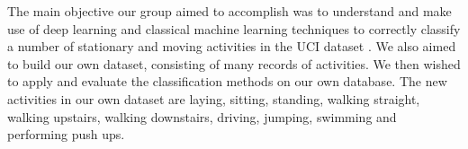 The main objective our group aimed to accomplish was to understand and make use of deep learning and classical machine learning
techniques to correctly classify a number of stationary and moving activities in the UCI dataset \cite{Anguita2013}. We also aimed to build our own dataset,
consisting of many records of activities. We then wished to apply and evaluate the classification methods on our own database. The new
activities in our own dataset are laying, sitting, standing, walking straight, walking upstairs, walking downstairs, driving, jumping, swimming
and performing push ups.

